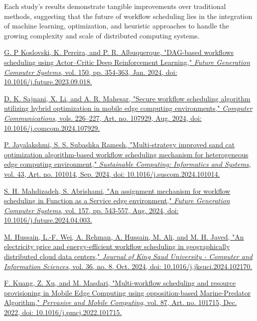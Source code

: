 \documentclass[a4paper, final]{article}
\begin{document}
Each study’s results demonstrate tangible improvements over traditional methods, 
suggesting that the future of workflow scheduling lies in the integration of machine learning, 
optimization, and heuristic approaches to handle the growing complexity and scale of distributed computing systems.

\cleardoublepage
{}
\newpage
\begin{thebibliography}{0}
	\href{https://doi.org/10.1016/j.future.2023.09.018}{
    G. P Koslovski, K. Pereira, and P. R. Albuquerque, 
    "DAG-based workflows scheduling using Actor–Critic Deep Reinforcement Learning,"
    \textit{Future Generation Computer Systems}, vol. 150, pp. 354-363, Jan. 2024, 
    doi: 10.1016/j.future.2023.09.018.
    }

	\href{https://doi.org/10.1016/j.comcom.2024.107929}{
    D. K. Sajnani, X. Li, and A. R. Mahesar,
    "Secure workflow scheduling algorithm utilizing hybrid optimization in mobile edge computing environments,"
    \textit{Computer Communications}, vols. 226–227, Art. no. 107929, Aug. 2024,
    doi: 10.1016/j.comcom.2024.107929.
    }

    \href{https://doi.org/10.1016/j.suscom.2024.101014}{
    P. Jayalakshmi, S. S. Subashka Ramesh,
    "Multi-strategy improved sand cat optimization algorithm-based workflow scheduling mechanism for
    heterogeneous edge computing environment,"
    \textit{Sustainable Computing: Informatics and Systems}, vol. 43, Art. no. 101014, Sep. 2024,
    doi: 10.1016/j.suscom.2024.101014.
    }

	\href{https://doi.org/10.1016/j.future.2024.04.003}{
    S. H. Mahdizadeh, S. Abrishami,
    "An assignment mechanism for workflow scheduling in Function as a Service edge environment,"
    \textit{Future Generation Computer Systems}, vol. 157, pp. 543-557, Aug. 2024,
    doi: 10.1016/j.future.2024.04.003.
    }

	\href{https://doi.org/10.1016/j.jksuci.2024.102170}{
    M. Hussain, L.-F. Wei, A. Rehman, A. Hussain, M. Ali, and M. H. Javed,
    "An electricity price and energy-efficient workflow scheduling in geographically distributed cloud data
    centers,"
    \textit{Journal of King Saud University - Computer and Information Sciences}, vol. 36, no. 8, Oct. 2024,
    doi: 10.1016/j.jksuci.2024.102170.
    }

	\href{https://doi.org/10.1016/j.pmcj.2022.101715}{
    F. Kuang, Z. Xu, and M. Masdari,
    "Multi-workflow scheduling and resource provisioning in Mobile Edge Computing using opposition-based
    Marine-Predator Algorithm,"
    \textit{Pervasive and Mobile Computing}, vol. 87, Art. no. 101715, Dec. 2022,
    doi: 10.1016/j.pmcj.2022.101715.
    }


\end{thebibliography}
\end{document}
